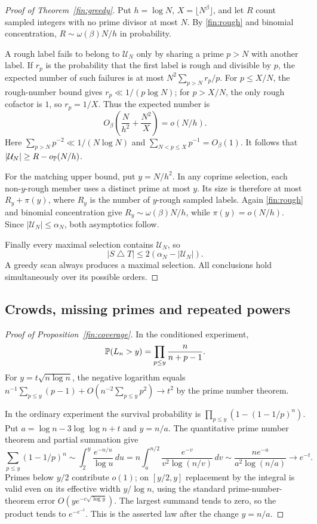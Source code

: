 \begin{proof}[Proof of Theorem~\ref{fin:greedy}]
Put $h=\log N$, $X=\lfloor N^\beta\rfloor$, and let $R$ count sampled
integers with no prime divisor at most $N$.  By \eqref{fin:rough} and
binomial concentration,
$R\sim\omega(\beta)N/h$ in probability.

A rough label fails to belong to $\mathcal U_N$ only by sharing a prime
$p>N$ with another label.  If $r_p$ is the probability that the first
label is rough and divisible by $p$, the expected number of such failures
is at most $N^2\sum_{p>N}r_p/p$.
For $p\le X/N$, the rough-number bound gives
$r_p\ll1/(p\log N)$; for $p>X/N$, the only rough cofactor is $1$,
so $r_p=1/X$.  Thus the expected number is
\[
 O_\beta\left(\frac{N}{h^2}+\frac{N^2}{X}\right)=o(N/h).
\]
Here $\sum_{p>N}p^{-2}\ll1/(N\log N)$ and
$\sum_{N<p\le X}p^{-1}=O_\beta(1)$.
It follows that $|\mathcal U_N|\ge R-o_{\mathbb P}(N/h)$.

For the matching upper bound, put $y=N/h^2$.  In any coprime selection,
each non-$y$-rough member uses a distinct prime at most $y$.
Its size is therefore at most $R_y+\pi(y)$, where $R_y$ is the number
of $y$-rough sampled labels.  Again \eqref{fin:rough} and binomial
concentration give $R_y\sim\omega(\beta)N/h$, while
$\pi(y)=o(N/h)$.  Since $|\mathcal U_N|\le\alpha_N$, both asymptotics
follow.

Finally every maximal selection contains $\mathcal U_N$, so
\[
 |S\mathbin{\triangle}T|\le2(\alpha_N-|\mathcal U_N|).
\]
A greedy scan always produces a maximal selection.  All conclusions
hold simultaneously over its possible orders.
\end{proof}

\subsection{Crowds, missing primes and repeated powers}\label{finapp:crowds}
\begin{proof}[Proof of Proposition~\ref{fin:coverage}]

In the conditioned experiment,
\[
 \mathbb P(L_n>y)=\prod_{p\le y}\frac n{n+p-1}.
\]
For $y=t\sqrt{n\log n}$, the negative logarithm equals
$n^{-1}\sum_{p\le y}(p-1)+
O(n^{-2}\sum_{p\le y}p^2)\to t^2$ by the prime number theorem.

In the ordinary experiment the survival probability is
$\prod_{p\le y}(1-(1-1/p)^n)$.
Put $a=\log n-3\log\log n+t$ and $y=n/a$.
The quantitative prime number theorem and partial summation give
\[
 \sum_{p\le y}(1-1/p)^n
 \sim \int_2^y\frac{e^{-n/u}}{\log u}\,du
 =n\int_a^{n/2}\frac{e^{-v}}{v^2\log(n/v)}\,dv
 \sim\frac{ne^{-a}}{a^2\log(n/a)}\to e^{-t}.
\]
Primes below $y/2$ contribute $o(1)$; on $[y/2,y]$ replacement by the
integral is valid even on its effective width $y/\log n$, using the
standard prime-number-theorem error $O(y e^{-c\sqrt{\log y}})$.
The largest summand tends to zero, so the product tends to
$e^{-e^{-t}}$.  This is the asserted law after the change $y=n/a$.
\end{proof}

